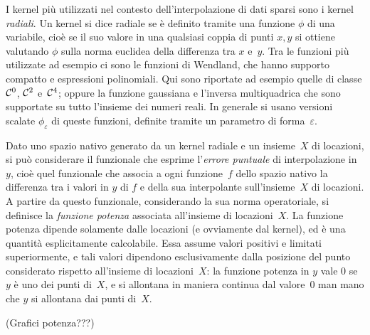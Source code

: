 I kernel più utilizzati nel contesto dell'interpolazione di dati sparsi sono i kernel {\em radiali}.  Un kernel si dice radiale se è definito tramite una funzione $\phi$ di una variabile, cioè se il suo valore in una qualsiasi coppia di punti $x,y$ si ottiene valutando $\phi$ sulla norma euclidea della differenza tra $x$ e~$y$.  
Tra le funzioni più utilizzate ad esempio ci sono le funzioni di Wendland, che hanno supporto compatto e espressioni polinomiali.  Qui sono riportate ad esempio quelle di classe ${\cal C}^0$, ${\cal C}^2$ e~${\cal C}^4$; oppure la funzione gaussiana e l'inversa multiquadrica che sono  supportate su tutto l'insieme dei numeri reali.
In generale si usano versioni scalate $\phi_\varepsilon$ di queste funzioni, definite tramite un parametro di forma~$\varepsilon$.



Dato uno spazio nativo generato da un kernel radiale e un insieme~$X$ di locazioni, si può considerare il funzionale che esprime l'{\em errore puntuale} di interpolazione in~$y$, cioè quel funzionale che associa a ogni funzione~$f$ dello spazio nativo la differenza tra i valori in $y$ di $f$ e della sua interpolante sull'insieme~$X$ di locazioni.  A partire da questo funzionale, considerando la sua norma operatoriale, si definisce la {\em funzione potenza} associata all'insieme di locazioni~$X$.  La funzione potenza dipende solamente dalle locazioni (e ovviamente dal kernel), ed è una quantità esplicitamente calcolabile.  Essa assume valori positivi e limitati superiormente, e tali valori dipendono esclusivamente dalla posizione del punto considerato rispetto all'insieme di locazioni~$X$: la funzione potenza in $y$ vale $0$ se $y$ è uno dei punti di~$X$,  e si allontana in maniera continua dal valore~$0$ man mano che $y$ si allontana dai punti di~$X$.

(Grafici potenza???)


